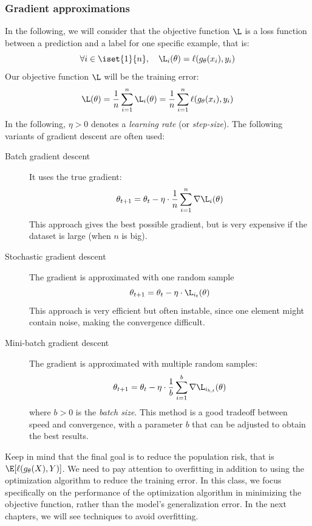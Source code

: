 \subsubsection{Gradient approximations}
In the following, we will consider that the objective function $\L$ is a loss function between a prediction and a label for one specific example, that is:
\begin{equation*}
    \forall i\in\iset{1}{n}, \quad \L_i(\theta) = \ell(g_\theta(x_i),y_i)
\end{equation*}
Our objective function $\L$ will be the training error:
\begin{equation*}
    \L(\theta) = \frac{1}{n}\sum_{i=1}^n \L_i(\theta) =  \frac{1}{n}\sum_{i=1}^n \ell(g_\theta(x_i),y_i)
\end{equation*}
In the following, $\eta>0$ denotes a \emph{learning rate} (or \emph{step-size}). The following variants of gradient descent are often used:
\begin{description}
    \item[Batch gradient descent] It uses the true gradient:
    \begin{equation*}
        \theta_{t+1} = \theta_t-\eta\cdot\frac{1}{n}\sum_{i=1}^n\nabla\L_i(\theta)
    \end{equation*}
    This approach gives the best possible gradient, but is very expensive if the dataset is large (when $n$ is big).
    \item[Stochastic gradient descent] The gradient is approximated with one random sample
    \begin{equation*}
        \theta_{t+1} = \theta_t-\eta\cdot\L_{i_t}(\theta)
    \end{equation*}
    This approach is very efficient but often instable, since one element might contain noise, making the convergence difficult.
    \item[Mini-batch gradient descent] The gradient is approximated with multiple random samples:
    \begin{equation*}
        \theta_{t+1} = \theta_t-\eta\cdot\frac{1}{b}\sum_{i=1}^b\nabla\L_{i_{b,t}}(\theta)
    \end{equation*} 
    where $b>0$ is the \emph{batch size}. This method is a good tradeoff between speed and convergence, with a parameter $b$ that can be adjusted to obtain the best results.
\end{description}

Keep in mind that the final goal is to reduce the population risk, that is $\E[\ell(g_\theta(X), Y)]$. We need to pay attention to overfitting in addition to using the optimization algorithm to reduce the training error. In this class, we focus specifically on the performance of the optimization algorithm in minimizing the objective function, rather than the model's generalization error. In the next chapters, we will see techniques to avoid overfitting.


